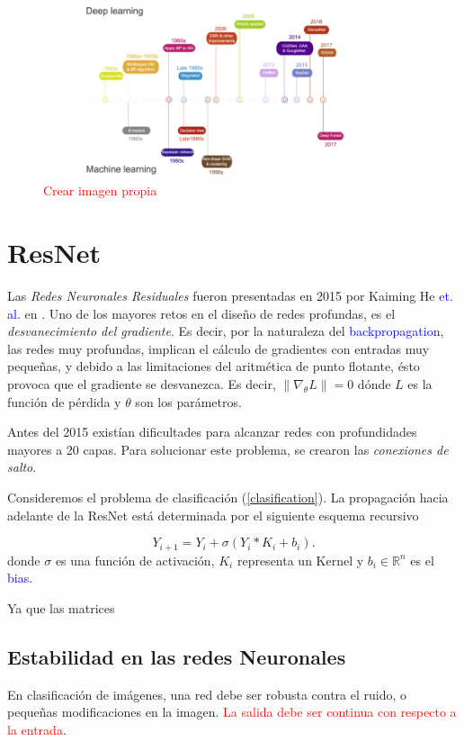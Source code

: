 \begin{figure}[H]
    \centering
    \includegraphics[width=4in]{../cap2_CNNs/src/timeline.png}
    \caption{\textcolor{red}{Crear imagen propia}} 
\end{figure}
\section{ResNet}
Las \textsl{Redes Neuronales Residuales} fueron presentadas en 2015 por Kaiming He \textcolor{blue}{et. al.} en \cite{resnet0}. Uno de los mayores retos en el diseño de redes profundas, es el \textsl{desvanecimiento del gradiente}. Es decir, por la naturaleza del \textcolor{blue}{backpropagation}, las redes muy profundas, implican el cálculo de gradientes con entradas muy pequeñas, y debido a las limitaciones del aritmética de punto flotante, ésto provoca que el gradiente se desvanezca.
Es decir, $\|\nabla_\theta L\| = 0$ dónde $L$ es la función de pérdida y $\theta$ son los parámetros. 

Antes del 2015 existían dificultades para alcanzar redes con profundidades mayores a 20 capas. Para solucionar este problema, se crearon las \textsl{conexiones de salto}.

\begin{definition} 
    Consideremos el problema de clasificación (\ref{clasification}). La propagación hacia adelante de la ResNet está determinada por el siguiente esquema recursivo

    \begin{equation}
        Y_{i+1} = Y_i + \sigma(Y_i * K_i + b_i).
    \end{equation}
    donde $\sigma$ es una función de activación, $K_i$ representa un Kernel y $b_i\in \mathbb R^n$ es el \textcolor{blue}{bias}.
\end{definition}
Ya que las matrices 
\subsection{Estabilidad en las redes Neuronales}
En clasificación de imágenes, una red debe ser robusta contra el ruido, o pequeñas modificaciones en la imagen. \textcolor{red}{La salida debe ser continua con respecto a la entrada}.

